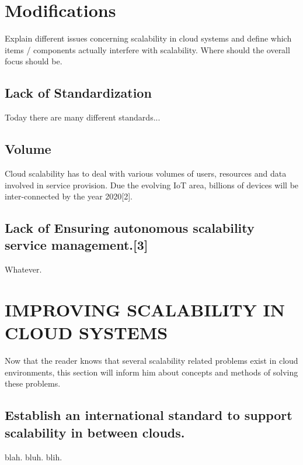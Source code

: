 \documentclass[sigconf]{acmart}
\begin{document}
\section{Modifications}

Explain different issues concerning scalability in cloud
systems and define which items / components actually
interfere with scalability. Where should the overall focus
should be.

\subsection{Lack of Standardization}
Today there are many different standards...

\subsection{Volume}
Cloud scalability has to deal with various
volumes of users, resources and data involved in service
provision. Due the evolving IoT area, billions of devices will
be inter-connected by the year 2020[2].

\subsection{Lack of Ensuring autonomous scalability service management.[3]}
Whatever.

\section{IMPROVING SCALABILITY IN CLOUD SYSTEMS}
Now that the reader knows that several scalability related
problems exist in cloud environments, this section will inform
him about concepts and methods of solving these problems.

\subsection{Establish an international standard to support scalability in between clouds.}
blah. bluh. blih.
\end{document}
